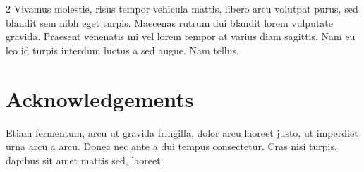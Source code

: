 \documentclass[a0,portrait]{a0poster}
\begin{document}
\begin{multicols}{2}
Vivamus molestie, risus tempor vehicula mattis, libero arcu volutpat purus, sed blandit sem nibh eget turpis. Maecenas rutrum dui blandit lorem vulputate gravida. Praesent venenatis mi vel lorem tempor at varius diam sagittis. Nam eu leo id turpis interdum luctus a sed augue. Nam tellus.


\nocite{*} %


\section*{Acknowledgements}

Etiam fermentum, arcu ut gravida fringilla, dolor arcu laoreet justo, ut imperdiet urna arcu a arcu. Donec nec ante a dui tempus consectetur. Cras nisi turpis, dapibus sit amet mattis sed, laoreet.


\end{multicols}
\end{document}
